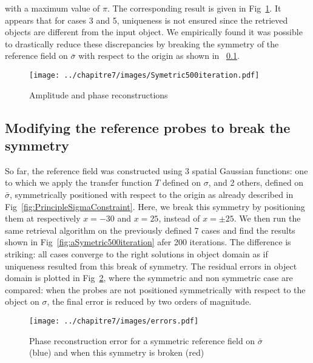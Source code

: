 \noindent with a maximum value of $\pi$. The corresponding result is given in Fig~\ref{fig:Symetric500iteration}. It appears that for cases 3 and 5, uniqueness is not ensured since the retrieved objects are different from the input object. We empirically found it was possible to drastically reduce these discrepancies by breaking the symmetry of the reference field on $\bar{\sigma}$ with respect to the origin as shown in ~\ref{subsection:Unicity solutions by break of symetry}. 

 \begin{figure}[H]
\centering
\texttt{[image: ../chapitre7/images/Symetric500iteration.pdf]}\\
\caption{\label{fig:Symetric500iteration}Amplitude and phase reconstructions}
\end{figure}

\newpage

\subsection{Modifying the reference probes to break the symmetry}\label{subsection:Unicity solutions by break of symetry}

So far, the reference field was constructed using 3 spatial Gaussian functions: one to which we apply the transfer function $T$ defined on $\sigma$, and 2 others, defined on $\bar{\sigma}$, symmetrically positioned with respect to the origin as already described in Fig~\ref{fig:PrincipleSigmaConstraint}. Here, we break this symmetry by positioning them at respectively $x= -30$ and $x=25$, instead of $x=\pm 25$. We then run the same retrieval algorithm on the previously defined 7 cases and find the results shown in Fig~\ref{fig:aSymetric500iteration} afer 200 iterations. The difference is striking: all cases converge to the right solutions in object domain as if uniqueness resulted from this break of symmetry. The residual errors in object domain is plotted in Fig~\ref{fig:errors}, where the symmetric and non symmetric case are compared: when the probes are not positioned symmetrically with respect to the object on $\sigma$, the final error is reduced by two orders of magnitude.

 \begin{figure}[H]
\begin{center}
\texttt{[image: ../chapitre7/images/errors.pdf]}\\
\caption{\label{fig:errors} Phase reconstruction error for a symmetric reference field on $\bar{\sigma}$ (blue) and when this symmetry is broken (red)}
\end{center}
\end{figure}


